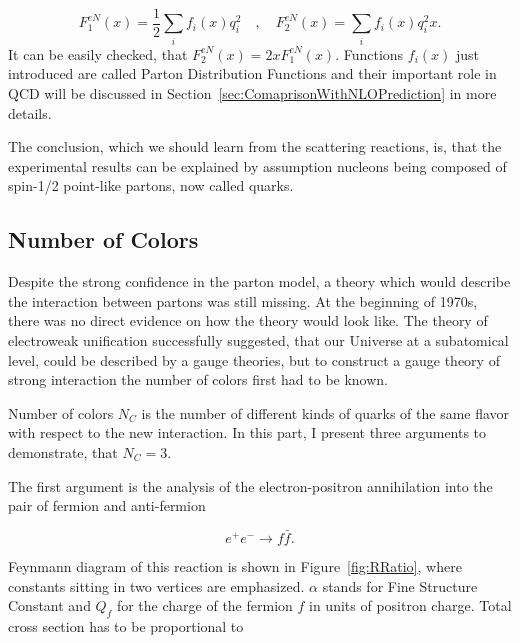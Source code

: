 \begin{equation}
  F_1^{eN}(x) = \frac{1}{2} \sum_i f_i(x)q_i^2
  \quad , \quad
  F_2^{eN}(x) = \sum_i f_i(x) q_i^2 x.
  \label{eq:StructureFunctionAndPDF}
\end{equation}
It can be easily checked, that $F_2^{eN}(x) = 2 x F_1^{eN}(x)$. Functions
$f_i(x)$ just introduced are called Parton Distribution Functions and their
important role in QCD will be discussed in
Section~\ref{sec:ComaprisonWithNLOPrediction} in more details.

The conclusion, which we should learn from the scattering reactions, is, that
the experimental results can be explained by assumption nucleons being composed of
spin-1/2 point-like partons, now called quarks. 

\subsection{Number of Colors}

Despite the strong confidence in the parton model, a theory which would describe the
interaction between partons was still missing. At the beginning of 1970s, there
was no direct evidence on how the theory would look like.
The theory of electroweak unification successfully suggested, that our Universe
at a subatomical level, could be described by a gauge theories, but 
to construct a gauge theory of strong interaction the number of colors first had
to be known.

Number of colors $N_C$ is the number of different kinds of quarks of the same
flavor with respect to the new interaction. In this part, I present three arguments 
to demonstrate, that $N_C = 3$.

The first argument is the analysis of the electron-positron annihilation into the
pair of fermion and anti-fermion

\begin{equation}
  e^+e^- \rightarrow f\bar{f}.
  \label{ElectronPositronAnihilation}
\end{equation}

Feynmann diagram of this reaction is shown in Figure~\ref{fig:RRatio}, where
constants sitting in two vertices are emphasized.  $\alpha$ stands for Fine
Structure Constant and $Q_f$ for the charge of the fermion $f$ in units of positron
charge. Total cross section has to be proportional to

